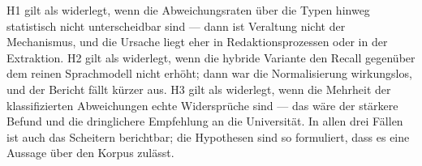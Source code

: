 H1 gilt als widerlegt, wenn die Abweichungsraten über die Typen hinweg statistisch nicht
unterscheidbar sind --- dann ist Veraltung nicht der Mechanismus, und die Ursache liegt eher
in Redaktionsprozessen oder in der Extraktion. H2 gilt als widerlegt, wenn die hybride
Variante den Recall gegenüber dem reinen Sprachmodell nicht erhöht; dann war die
Normalisierung wirkungslos, und der Bericht fällt kürzer aus. H3 gilt als widerlegt, wenn die
Mehrheit der klassifizierten Abweichungen echte Widersprüche sind --- das wäre der stärkere
Befund und die dringlichere Empfehlung an die Universität. In allen drei Fällen ist auch das
Scheitern berichtbar; die Hypothesen sind so formuliert, dass es eine Aussage über den Korpus
zulässt.
